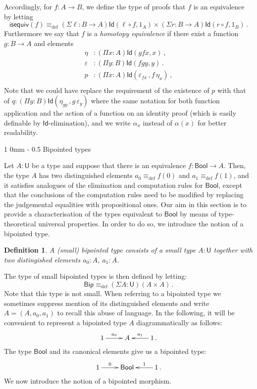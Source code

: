 \documentclass[10pt,a4paper,oneside,reqno]{amsart}
\makeatletter
\numberwithin{equation}{section}
\renewcommand{\section}{\@startsection
  {section}%
   {1}%
  {0mm}%
   {-\baselineskip}%
  {0.5\baselineskip}%
   {\Large\bfseries}}%
\theoremstyle{mythm}
\theoremstyle{mydef}
\newtheorem{definition}[theorem]{Definition}
\theoremstyle{myrmk}
\newcommand{\deq}{\equiv}
\newcommand{\defeq}{\deq_{\mathrm{def}}}
\newcommand{\co}{\colon}
\newcommand{\isequiv}{\mathsf{isequiv}}
\newcommand{\Id}{\mathsf{Id}}
\newcommand{\Bool}{\mathsf{Bool}}
\newcommand{\UU}{\mathsf{U}}
\newcommand{\Bip}{\mathsf{Bip}}
\makeatother
\begin{document}
 Accordingly, for $f : A \rightarrow B$, we define the type of proofs that $f$ is an equivalence by letting
 \[ 
 \isequiv(f) \defeq (\Sigma \ell \co B \to A) \Id( \ell \circ f, 1_A) \times (\Sigma r \co B \to A) \Id( r \circ f , 1_B) \, .
 \]
Furthermore we say that $f$ is a \emph{homotopy equivalence} if there exist a function 
$g : B\rightarrow A$ and elements
\begin{align*}
\eta &: (\Pi x : A) \Id( g  f  x , x) \,  ,\\
\varepsilon &: (\Pi y:B) \Id( f   g  y, y) \, . \\
p & : (\Pi x : A) \Id ( \varepsilon_{f x} \, , f \, \eta_x )  \, , \\
\end{align*}
Note that we could have replace the requirement of the existence of $p$ with that of $q \co (\Pi y : B) \Id ( \eta_{g y} \, , g \, \varepsilon_y)$
where the same notation for both function application and
the action of a function on an identity proof (which is easily definable by $\Id$-elimination),
and we write $\alpha_x$ instead of $\alpha(x)$ for better readability.


\newpage

\section{Bipointed types}
\label{sec:bip}



Let $A \co \UU$ be a type and suppose that there is an equivalence $f \co \Bool \to A$. Then, the type $A$ 
has two distinguished elements $a_0 \defeq f(0)$ and $a_1 \defeq f(1)$, and it satisfies
analogues of the elimination and computation rules for $\Bool$, except that the conclusions of the computation 
rules need to be modified  by replacing the judgemental equalities  with propositional ones. Our aim in this section is to provide a characterisation of the types equivalent to $\Bool$ by means of type-theoretical universal properties. In order to do so, we introduce the notion of a bipointed type. 


\begin{definition} \label{thm:bipointedtype}
A  (small) \emph{bipointed type} consists of a small type $A \co \UU$ together with two distingished elements $a_0 \co A$, $a_1 : A$.
\end{definition}

The type of small bipointed types is then defined by letting:
\[
\Bip \defeq (\Sigma A : \UU)( A \times A ) \, .
\]
Note that this type is not small.
When referring to a bipointed type we sometimes suppress mention of its distinguished elements and write $A = (A, a_0, a_1)$ to
recall this abuse of language.  In the following, it will be convenient to represent a bipointed type $A$ diagrammatically as follows:
\[
\xymatrix{
 1 \ar[r]^-{a_0}&  A & 1 \ar[l]_-{a_1} \, .}
 \]
The type $\Bool$ and its canonical elements give us a bipointed type:
\[
\xymatrix{
 1 \ar[r]^-{0}&  \Bool  & 1 \ar[l]_-{1} \, . }
 \]
We now introduce the notion of a bipointed morphism.
\end{document}
